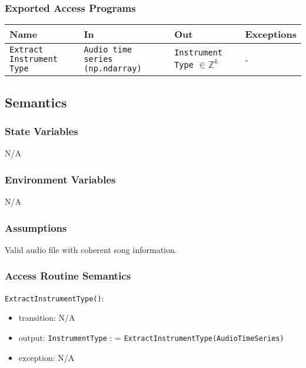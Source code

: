 \documentclass[12pt, titlepage]{article}
\begin{document}
\subsubsection{Exported Access Programs}

\begin{center}
\begin{tabular}{p{2cm} p{4cm} p{4cm} p{2cm}}
\hline
\textbf{Name} & \textbf{In} & \textbf{Out} & \textbf{Exceptions}\\
\hline%
\texttt{Extract Instrument Type} &\texttt{Audio time series (np.ndarray)} &\texttt{Instrument Type} $\in \mathbb{Z}^k$ &-\\
\hline
\end{tabular}
\end{center}

\subsection{Semantics}

\subsubsection{State Variables}
N/A

\subsubsection{Environment Variables}
N/A

\subsubsection{Assumptions}
Valid audio file with coherent song information.

\subsubsection{Access Routine Semantics}

\noindent \texttt{ExtractInstrumentType()}:
\begin{itemize}
\item transition: N/A
\item output: \texttt{Instrument\textunderscore Type} : = \texttt{ExtractInstrumentType(Audio\textunderscore Time\textunderscore Series)}
\item exception: N/A 
\end{itemize}
\end{document}
